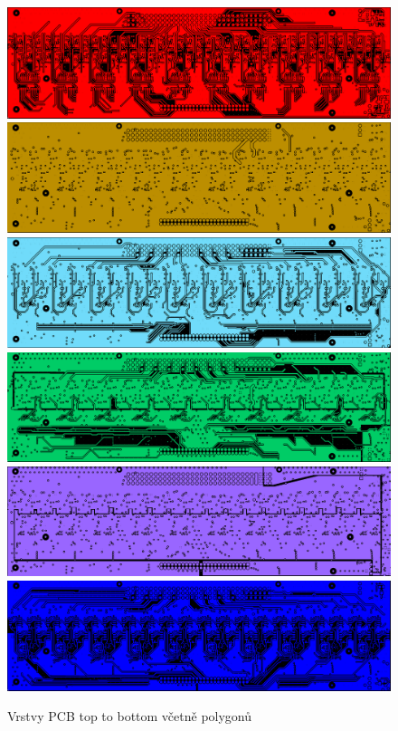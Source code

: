\begin{figure}[ht!]
    \centering
    \includegraphics[height = 0.15\textheight]{obrazky/layer_top.png}
    \includegraphics[height = 0.15\textheight]{obrazky/layer_2.png}
    \includegraphics[height = 0.15\textheight]{obrazky/layer_3.png}
    \includegraphics[height = 0.15\textheight]{obrazky/layer_4.png}
    \includegraphics[height = 0.15\textheight]{obrazky/layer_5.png}
    \includegraphics[height = 0.15\textheight]{obrazky/layer_bot.png}
    \caption{Vrstvy PCB top to bottom včetně polygonů}
    \label{fig:Vrstvy PCB top to bottom}
    
\end{figure}

